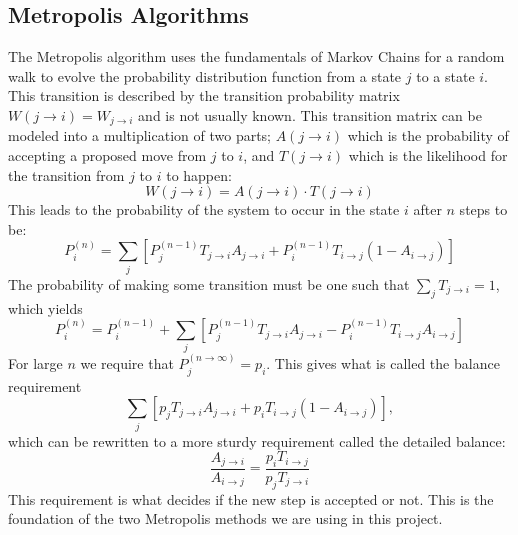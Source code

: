 \documentclass[12pt,a4paper,english]{article}
\begin{document}
\subsection{Metropolis Algorithms}
\label{subsect:Metropolis}
The Metropolis algorithm uses the fundamentals of Markov Chains for a random walk to evolve the probability distribution function from a state $j$ to a state $i$. This transition is described by the transition probability matrix $W(j\rightarrow i)=W_{j\rightarrow i}$ and is not usually known. This transition matrix can be modeled into a multiplication of two parts; $A(j\rightarrow i)$ which is the probability of accepting a proposed move from $j$ to $i$, and $T(j\rightarrow i)$ which is the likelihood for the transition from $j$ to $i$ to happen: 
\begin{equation}
\label{eq:Transition_prob}
W(j\rightarrow i)=A(j\rightarrow i)\cdot T(j\rightarrow i)
\end{equation}
This leads to the probability of the system to occur in the state $i$ after $n$ steps to be:
\begin{equation*}
\label{eq:Prob_state1}
P_i^{(n)}=\sum_{j}\left[P_j^{(n-1)}T_{j\rightarrow i}A_{j\rightarrow i}+ P_i^{(n-1)}T_{i\rightarrow j}(1-A_{i\rightarrow j})\right]
\end{equation*}
The probability of making some transition must be one such that $\sum_{j}T_{j\rightarrow i}=1$, which yields
\begin{equation*}
\label{eq:Prob_state2}
P_i^{(n)}=P_i^{(n-1)}+\sum_{j}\left[P_j^{(n-1)}T_{j\rightarrow i}A_{j\rightarrow i}- P_i^{(n-1)}T_{i\rightarrow j}A_{i\rightarrow j}\right]
\end{equation*}
For large $n$ we require that $P_j^{(n\rightarrow\infty)}=p_i$. This gives what is called the balance requirement
\[\sum_{j}\left[p_jT_{j\rightarrow i}A_{j\rightarrow i}+ p_iT_{i\rightarrow j}(1-A_{i\rightarrow j})\right],\]
which can be rewritten to a more sturdy requirement called the detailed balance:
\begin{equation}
\label{eq:detailed_balance}
\frac{A_{j\rightarrow i}}{A_{i\rightarrow j}}=\frac{p_iT_{i\rightarrow j}}{p_jT_{j\rightarrow i}}
\end{equation}
This requirement is what decides if the new step is accepted or not. This is the foundation of the two Metropolis methods we are using in this project.
\end{document}
